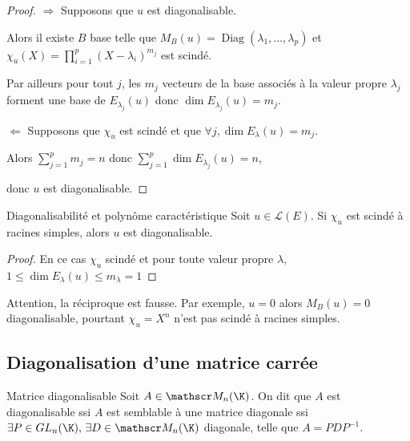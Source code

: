 \begin{proof}
    $\Rightarrow$ Supposons que $u$ est diagonalisable.

    Alors il existe $B$ base telle que $M_B(u) = \operatorname{Diag}(\lambda_1, \ldots, \lambda_p)$
    et $\displaystyle \chi_u(X) = \prod_{i = 1 }^{ p } (X - \lambda_i)^{m_j}$ est scindé. 

    Par ailleurs pour tout $j$, les $m_j$ vecteurs de la base associés à la valeur propre $\lambda_j$
    forment une base de $E_{\lambda_j}(u)$ donc $\dim E_{\lambda_j}(u) = m_j$. 

    \lvspace $\Leftarrow$ Supposons que $\chi_u$ est scindé et que $\forall j, \dim E_\lambda(u) = m_j$.

    Alors $\displaystyle \sum_{j = 1 }^{ p } m_j = n$ donc $\displaystyle \sum_{j = 1 }^{ p } \dim E_{\lambda_j}(u) = n$, 

    donc $u$ est diagonalisable.
\end{proof}


\begin{proposition}{Diagonalisabilité et polynôme caractéristique}{}
    Soit $u \in \mathscr L(E)$. Si $\chi_u$ est scindé à racines simples, alors $u$ est diagonalisable.
\end{proposition}

\begin{proof}
    En ce cas $\chi_u$ scindé et pour toute valeur propre $\lambda$, $1 \leqslant \dim E_\lambda(u) \leqslant m_\lambda = 1$
\end{proof}

\begin{remarque}
    Attention, la réciproque est fausse. Par exemple, $u = 0$ alors $M_B(u) = 0$ diagonalisable, pourtant 
    $\chi_u = X^n$ n'est pas scindé à racines simples.
\end{remarque}

\subsection{Diagonalisation d'une matrice carrée }

\begin{definition}{Matrice diagonalisable}{}
    Soit $A \in \mathscr M_n(\K)$. On dit que $A$ est diagonalisable ssi $A$ est semblable à une matrice diagonale
    ssi $\exists P \in GL_n(\K), \, \exists D \in \mathscr M_n(\K)$ diagonale, telle que $A = P D P^{-1}$.
\end{definition}

